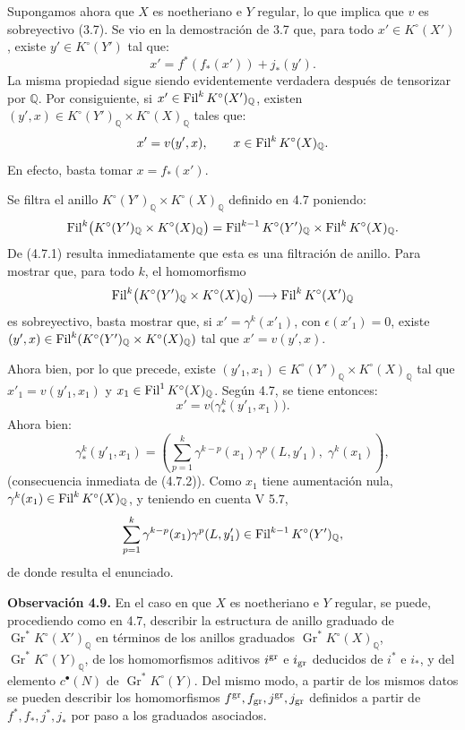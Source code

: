 \providecommand{\sisi}[2]{#2}

Supongamos ahora que \(X\) es noetheriano e \(Y\) regular, lo que implica que \(v\) es sobreyectivo (3.7). Se vio en la demostración de 3.7 que, para todo \(x'\in K^\circ(X')\), existe \(y'\in K^\circ(Y')\) tal que:
\[
  x'=f^*(f_*(x'))+j_*(y').
\]
La misma propiedad sigue siendo evidentemente verdadera después de tensorizar por \(\mathbb Q\). Por consiguiente, si \(x'\in\operatorname{Fil}^kK^\circ(X')_{\mathbb Q}\), existen \((y',x)\in K^\circ(Y')_{\mathbb Q}\times K^\circ(X)_{\mathbb Q}\) tales que:
\[
  x'=v(y',x),\qquad x\in\operatorname{Fil}^kK^\circ(X)_{\mathbb Q}.
\]
En efecto, basta tomar \(x=f_*(x')\).

Se filtra el anillo \(K^\circ(Y')_{\mathbb Q}\times K^\circ(X)_{\mathbb Q}\) definido en 4.7 poniendo:
\[
  \operatorname{Fil}^k\bigl(K^\circ(Y')_{\mathbb Q}\times K^\circ(X)_{\mathbb Q}\bigr)
  =
  \operatorname{Fil}^{k-1}K^\circ(Y')_{\mathbb Q}\times \operatorname{Fil}^kK^\circ(X)_{\mathbb Q}.
\]
De (4.7.1) resulta inmediatamente que esta es una filtración de anillo. Para mostrar que, para todo \(k\), el homomorfismo
\[
  \operatorname{Fil}^k\bigl(K^\circ(Y')_{\mathbb Q}\times K^\circ(X)_{\mathbb Q}\bigr)
  \longrightarrow
  \operatorname{Fil}^kK^\circ(X')_{\mathbb Q}
\]
es sobreyectivo, basta mostrar que, si \(x'= \gamma^k(x'_1)\), con \(\epsilon(x'_1)=0\), existe \((y',x)\in\operatorname{Fil}^k(K^\circ(Y')_{\mathbb Q}\times K^\circ(X)_{\mathbb Q})\) tal que \(x'=v(y',x)\).

Ahora bien, por lo que precede, existe \((y'_1,x_1)\in K^\circ(Y')_{\mathbb Q}\times K^\circ(X)_{\mathbb Q}\) tal que \(x'_1=v(y'_1,x_1)\) y \(x_1\in\operatorname{Fil}^1K^\circ(X)_{\mathbb Q}\). Según 4.7, se tiene entonces:
\[
  x'=v\bigl(\gamma^k_*(y'_1,x_1)\bigr).
\]
Ahora bien:
\[
  \gamma^k_*(y'_1,x_1)
  =
  \left(\sum_{p=1}^{k}\gamma^{k-p}(x_1)\gamma^p(L,y'_1),\;
  \gamma^k(x_1)\right),
\]
(consecuencia inmediata de (4.7.2)). Como \(x_1\) tiene aumentación nula, \(\gamma^k(x_1)\in\operatorname{Fil}^kK^\circ(X)_{\mathbb Q}\), y teniendo en cuenta V 5.7,
\[
  \sum_{p=1}^{k}\gamma^{k-p}(x_1)\gamma^p(L,y'_1)
  \in\operatorname{Fil}^{k-1}K^\circ(Y')_{\mathbb Q},
\]
de donde resulta el enunciado.

\textbf{Observación 4.9.} En el caso en que \(X\) es noetheriano e \(Y\) regular, se puede, procediendo como en 4.7, describir la estructura de anillo graduado de \(\operatorname{Gr}^*K^\circ(X')_{\mathbb Q}\) en términos de los anillos graduados \(\operatorname{Gr}^*K^\circ(X)_{\mathbb Q}\), \(\operatorname{Gr}^*K^\circ(Y)_{\mathbb Q}\), de los homomorfismos aditivos \(i^{\operatorname{gr}}\) e \(i_{\operatorname{gr}}\) deducidos de \(i^*\) e \(i_*\), y del elemento \(c^{\bullet}(N)\) de \(\operatorname{Gr}^*K^\circ(Y)\). Del mismo modo, a partir de los mismos datos se pueden describir los homomorfismos \(f^{\operatorname{gr}},f_{\operatorname{gr}},j^{\operatorname{gr}},j_{\operatorname{gr}}\) definidos a partir de \(f^*,f_*,j^*,j_*\) por paso a los graduados asociados.

